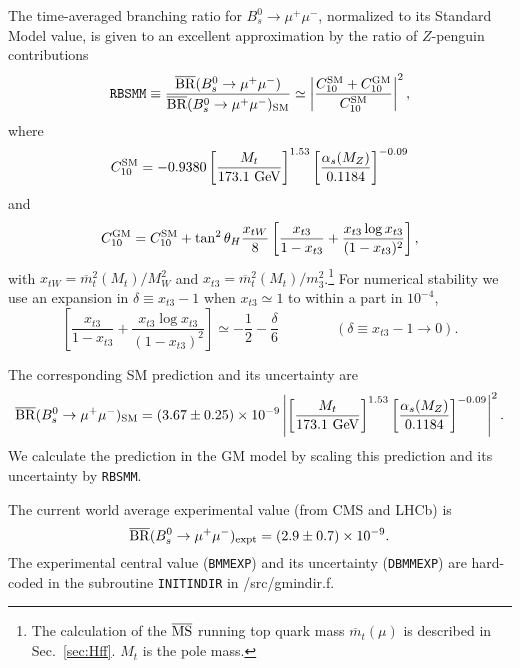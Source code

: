 \documentclass[11pt]{article}
\begin{document}
The time-averaged branching ratio for $B_s^0 \to \mu^+ \mu^-$, normalized to its Standard Model value, is given to an excellent approximation by the ratio of $Z$-penguin contributions~\cite{indirect,Li:2014fea}
\begin{equation}
	{\tt RBSMM} \equiv 
	\frac{\overline {\rm BR}(B_s^0 \to \mu^+ \mu^-)}{\overline {\rm BR}(B_s^0 \to \mu^+ \mu^-)_{\rm SM}}
	\simeq \left| \frac{C_{10}^{\rm SM} + C_{10}^{\rm GM}}{C_{10}^{\rm SM}} \right|^2,
\end{equation}
where~\cite{Li:2014fea}
\begin{equation}
	C_{10}^{\rm SM} = -0.9380 \left[ \frac{M_t}{173.1~{\rm GeV}} \right]^{1.53}
	\left[ \frac{\alpha_s(M_Z)}{0.1184} \right]^{-0.09}
\end{equation}
and~\cite{indirect,Li:2014fea}
\begin{equation}
	C_{10}^{\rm GM} = C_{10}^{\rm SM} + \tan^2 \theta_H \frac{x_{tW}}{8}
	\left[ \frac{x_{t3}}{1-x_{t3}} + \frac{x_{t3} \log x_{t3}}{(1-x_{t3})^2} \right],
\end{equation}
with $x_{tW} = \overline m_{t}^2(M_t)/M_W^2$ and $x_{t3} = \overline m_t^2(M_t)/m_3^2$.\footnote{The calculation of the $\overline{\rm MS}$ running top quark mass $\overline m_t(\mu)$ is described in Sec.~\ref{sec:Hff}.  $M_t$ is the pole mass.}  For numerical stability we use an expansion in $\delta \equiv x_{t3}-1$ when $x_{t3} \simeq 1$ to within a part in $10^{-4}$, 
\begin{equation}
	\left[ \frac{x_{t3}}{1-x_{t3}} + \frac{x_{t3} \log x_{t3}}{(1-x_{t3})^2} \right] \simeq -\frac{1}{2} - \frac{\delta}{6}
	\qquad \qquad (\delta \equiv x_{t3} -1 \to 0).
\end{equation}

The corresponding SM prediction and its uncertainty are~\cite{Li:2014fea}
\begin{equation}
	\overline {\rm BR}(B_s^0 \to \mu^+ \mu^-)_{\rm SM} = (3.67 \pm 0.25) \times 10^{-9}
	\left|\left[ \frac{M_t}{173.1~{\rm GeV}} \right]^{1.53}
	\left[ \frac{\alpha_s(M_Z)}{0.1184} \right]^{-0.09} \right|^2.
\end{equation}
We calculate the prediction in the GM model by scaling this prediction and its uncertainty by {\tt RBSMM}.

The current world average experimental value (from CMS and LHCb) is~\cite{bsmmexp}
\begin{equation}
	\overline {\rm BR}(B_s^0 \to \mu^+\mu^-)_{\rm expt} = (2.9 \pm 0.7) \times 10^{-9}.
\end{equation}
The experimental central value ({\tt BMMEXP}) and its uncertainty ({\tt DBMMEXP}) are hard-coded in the subroutine {\tt INITINDIR} in /src/gmindir.f.
\end{document}
